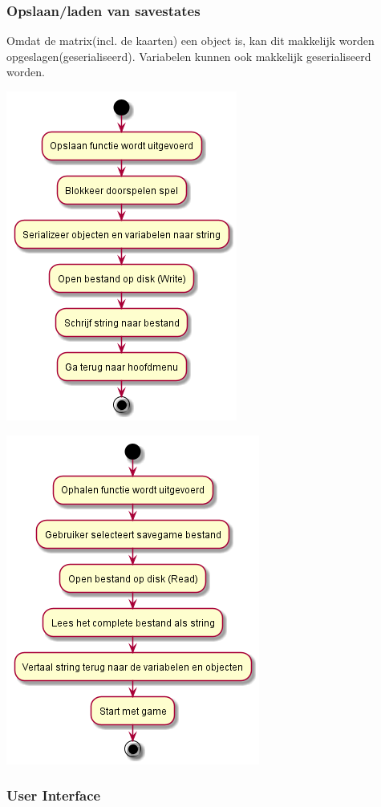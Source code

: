 \documentclass[a4paper,titlepage,11pt]{article}
\begin{document}
\subsubsection{Opslaan/laden van savestates}

Omdat de matrix(incl. de kaarten) een object is,
kan dit makkelijk worden opgeslagen(geserialiseerd).
Variabelen kunnen ook makkelijk geserialiseerd worden.

\begin{center}
\includegraphics[width=.5\linewidth]{../Images/serialization.png}
\end{center}

\begin{center}
\includegraphics[width=.5\linewidth]{../Images/serialization2.png}
\end{center}

\subsubsection{User Interface}
\end{document}
